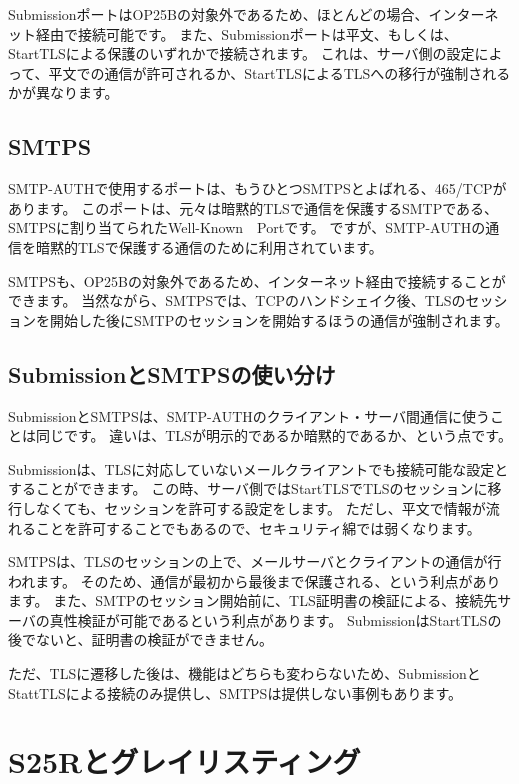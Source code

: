 SubmissionポートはOP25Bの対象外であるため、ほとんどの場合、インターネット経由で接続可能です。
また、Submissionポートは平文、もしくは、StartTLSによる保護のいずれかで接続されます。
これは、サーバ側の設定によって、平文での通信が許可されるか、StartTLSによるTLSへの移行が強制されるかが異なります。

\subsection{SMTPS}

SMTP-AUTHで使用するポートは、もうひとつSMTPSとよばれる、465/TCPがあります。
このポートは、元々は暗黙的TLSで通信を保護するSMTPである、SMTPSに割り当てられたWell-Known　Portです。
ですが、SMTP-AUTHの通信を暗黙的TLSで保護する通信のために利用されています。

SMTPSも、OP25Bの対象外であるため、インターネット経由で接続することができます。
当然ながら、SMTPSでは、TCPのハンドシェイク後、TLSのセッションを開始した後にSMTPのセッションを開始するほうの通信が強制されます。

\subsection{SubmissionとSMTPSの使い分け}

SubmissionとSMTPSは、SMTP-AUTHのクライアント・サーバ間通信に使うことは同じです。
違いは、TLSが明示的であるか暗黙的であるか、という点です。

Submissionは、TLSに対応していないメールクライアントでも接続可能な設定とすることができます。
この時、サーバ側ではStartTLSでTLSのセッションに移行しなくても、セッションを許可する設定をします。
ただし、平文で情報が流れることを許可することでもあるので、セキュリティ綿では弱くなります。

SMTPSは、TLSのセッションの上で、メールサーバとクライアントの通信が行われます。
そのため、通信が最初から最後まで保護される、という利点があります。
また、SMTPのセッション開始前に、TLS証明書の検証による、接続先サーバの真性検証が可能であるという利点があります。
SubmissionはStartTLSの後でないと、証明書の検証ができません。

ただ、TLSに遷移した後は、機能はどちらも変わらないため、SubmissionとStattTLSによる接続のみ提供し、SMTPSは提供しない事例もあります。


\section{S25Rとグレイリスティング}

